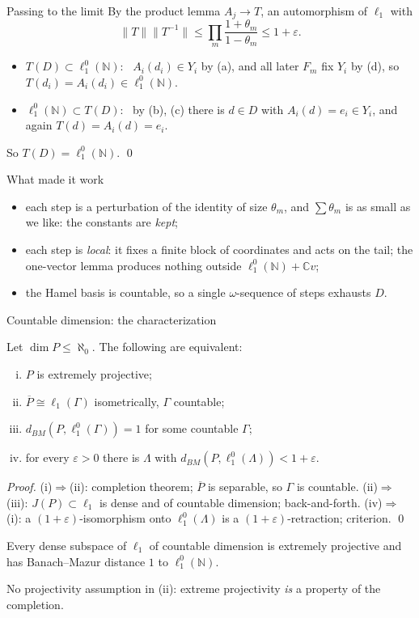 \documentclass[10pt,aspectratio=169]{beamer}
\newcommand{\lo}[1]{\ell_1^0(#1)}
\newcommand{\ellone}[1]{\ell_1(#1)}
\newcommand{\BM}{d_{BM}}
\newcommand{\NN}{\mathbb N}
\newcommand{\CC}{\mathbb C}
\begin{document}
\begin{frame}{Passing to the limit}
  By the product lemma $A_j\to T$, an automorphism of $\ell_1$ with
  \[
    \|T\|\|T^{-1}\|\le\prod_m\frac{1+\theta_m}{1-\theta_m}\le1+\varepsilon .
  \]
  \begin{itemize}
    \item $T(D)\subset\lo\NN$: \ $A_i(d_i)\in Y_i$ by (a), and all later $F_m$
      fix $Y_i$ by (d), so $T(d_i)=A_i(d_i)\in\lo\NN$.
    \item $\lo\NN\subset T(D)$: \ by (b), (c) there is $d\in D$ with
      $A_i(d)=e_i\in Y_i$, and again $T(d)=A_i(d)=e_i$.
  \end{itemize}
  So $T(D)=\lo\NN$. \qed
  \begin{alertblock}{What made it work}
    \begin{itemize}
      \item each step is a perturbation of the identity of size $\theta_m$, and
        $\sum\theta_m$ is as small as we like: the constants are \emph{kept};
      \item each step is \emph{local}: it fixes a finite block of coordinates and
        acts on the tail; the one-vector lemma produces nothing outside
        $\lo\NN+\CC v$;
      \item the Hamel basis is countable, so a single $\omega$-sequence of steps
        exhausts $D$.
    \end{itemize}
  \end{alertblock}
\end{frame}

\begin{frame}{Countable dimension: the characterization}
  \begin{theorem}
    Let $\dim P\le\aleph_0$. The following are equivalent:
    \begin{enumerate}[(i)]
      \item $P$ is extremely projective;
      \item $\overline P\cong\ellone\Gamma$ isometrically, $\Gamma$ countable;
      \item $\BM(P,\lo\Gamma)=1$ for some countable $\Gamma$;
      \item for every $\varepsilon>0$ there is $\Lambda$ with $\BM(P,\lo\Lambda)<1+\varepsilon$.
    \end{enumerate}
  \end{theorem}
  \textit{Proof.} (i)$\Rightarrow$(ii): completion theorem; $\overline P$ is
  separable, so $\Gamma$ is countable.
  (ii)$\Rightarrow$(iii): $J(P)\subset\ell_1$ is dense and of countable dimension;
  back-and-forth.
  (iv)$\Rightarrow$(i): a $(1+\varepsilon)$-isomorphism onto $\lo\Lambda$ is a
  $(1+\varepsilon)$-retraction; criterion. \qed
  \begin{corollary}
    Every dense subspace of $\ell_1$ of countable dimension is extremely
    projective and has Banach--Mazur distance $1$ to $\lo\NN$.
  \end{corollary}
  No projectivity assumption in (ii): extreme projectivity \emph{is} a
  property of the completion.
\end{frame}
\end{document}
